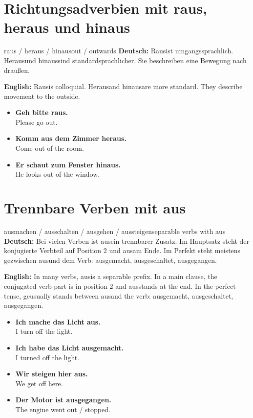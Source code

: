 \documentclass[a4paper,11pt]{article}
\newcommand{\GermanText}[1]{\textbf{Deutsch: }#1\par}
\newcommand{\EnglishText}[1]{{\small\color{SoftGray}\textbf{English: }#1\par}}
\newcommand{\ExampleItem}[2]{\item \textbf{#1}\\{\small\color{SoftGray}#2}}
\begin{document}
\section{Richtungsadverbien mit raus, heraus und hinaus}

\begin{grammarentry}{raus / heraus / hinaus}{out / outwards}
\GermanText{\glqq Raus\grqq ist umgangssprachlich. \glqq Heraus\grqq und \glqq hinaus\grqq sind standardsprachlicher. Sie beschreiben eine Bewegung nach draußen.}
\EnglishText{\glqq Raus\grqq is colloquial. \glqq Heraus\grqq and \glqq hinaus\grqq are more standard. They describe movement to the outside.}

\begin{exbox}
\begin{itemize}
    \ExampleItem{Geh bitte raus.}{Please go out.}
    \ExampleItem{Komm aus dem Zimmer heraus.}{Come out of the room.}
    \ExampleItem{Er schaut zum Fenster hinaus.}{He looks out of the window.}
\end{itemize}
\end{exbox}
\end{grammarentry}

\section{Trennbare Verben mit aus}

\begin{grammarentry}{ausmachen / ausschalten / ausgehen / aussteigen}{separable verbs with aus}
\GermanText{Bei vielen Verben ist \glqq aus\grqq ein trennbarer Zusatz. Im Hauptsatz steht der konjugierte Verbteil auf Position 2 und \glqq aus\grqq am Ende. Im Perfekt steht meistens \glqq ge\grqq zwischen \glqq aus\grqq und dem Verb: ausgemacht, ausgeschaltet, ausgegangen.}
\EnglishText{In many verbs, \glqq aus\grqq is a separable prefix. In a main clause, the conjugated verb part is in position 2 and \glqq aus\grqq stands at the end. In the perfect tense, \glqq ge\grqq usually stands between \glqq aus\grqq and the verb: ausgemacht, ausgeschaltet, ausgegangen.}

\begin{exbox}
\begin{itemize}
    \ExampleItem{Ich mache das Licht aus.}{I turn off the light.}
    \ExampleItem{Ich habe das Licht ausgemacht.}{I turned off the light.}
    \ExampleItem{Wir steigen hier aus.}{We get off here.}
    \ExampleItem{Der Motor ist ausgegangen.}{The engine went out / stopped.}
\end{itemize}
\end{exbox}
\end{grammarentry}
\end{document}
